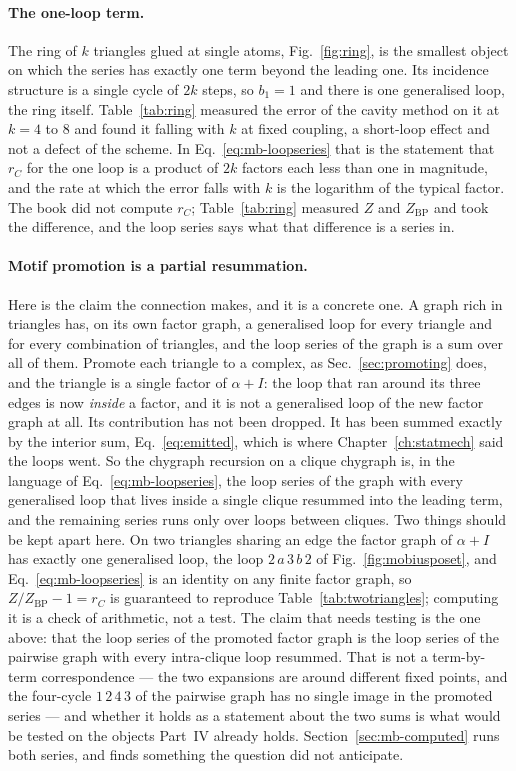 \paragraph{The one-loop term.} The ring of $k$ triangles glued at single
atoms, Fig.~\ref{fig:ring}, is the smallest object on which the series has
exactly one term beyond the leading one. Its incidence structure is a single
cycle of $2k$ steps, so $b_{1}=1$ and there is one generalised loop, the ring
itself. Table~\ref{tab:ring} measured the error of the cavity method on it at
$k=4$ to $8$ and found it falling with $k$ at fixed coupling, a short-loop
effect and not a defect of the scheme. In Eq.~\eqref{eq:mb-loopseries} that
is the statement that $r_{C}$ for the one loop is a product of $2k$ factors
each less than one in magnitude, and the rate at which the error falls with
$k$ is the logarithm of the typical factor. The book did not compute
$r_{C}$; Table~\ref{tab:ring} measured $Z$ and $Z_{\mathrm{BP}}$ and took
the difference, and the loop series says what that difference is a series
in.

\paragraph{Motif promotion is a partial resummation.} Here is the claim the
connection makes, and it is a concrete one. A graph rich in triangles has, on
its own factor graph, a generalised loop for every triangle and for every
combination of triangles, and the loop series of the graph is a sum over all
of them. Promote each triangle to a complex, as Sec.~\ref{sec:promoting}
does, and the triangle is a single factor of $\alpha+I$: the loop that ran
around its three edges is now \emph{inside} a factor, and it is not a
generalised loop of the new factor graph at all. Its contribution has not
been dropped. It has been summed exactly by the interior sum, Eq.~\eqref{eq:emitted},
which is where Chapter~\ref{ch:statmech} said the loops went. So the chygraph
recursion on a clique chygraph is, in the language of
Eq.~\eqref{eq:mb-loopseries}, the loop series of the graph with every
generalised loop that lives inside a single clique resummed into the leading
term, and the remaining series runs only over loops between cliques.
Two things should be kept apart here. On two triangles sharing an edge
the factor graph of $\alpha+I$ has exactly one generalised loop, the loop
$2\,a\,3\,b\,2$ of Fig.~\ref{fig:mobiusposet}, and
Eq.~\eqref{eq:mb-loopseries} is an identity on any finite factor graph, so
$Z/Z_{\mathrm{BP}}-1=r_{C}$ is guaranteed to reproduce
Table~\ref{tab:twotriangles}; computing it is a check of arithmetic, not
a test. The claim that needs testing is the one above: that the loop
series of the promoted factor graph is the loop series of the pairwise
graph with every intra-clique loop resummed. That is not a term-by-term
correspondence --- the two expansions are around different fixed points,
and the four-cycle $1\,2\,4\,3$ of the pairwise graph has no single image
in the promoted series --- and whether it holds as a statement about the
two sums is what would be tested on the objects Part~IV already holds. Section~\ref{sec:mb-computed} runs both series, and finds something the
question did not anticipate.


